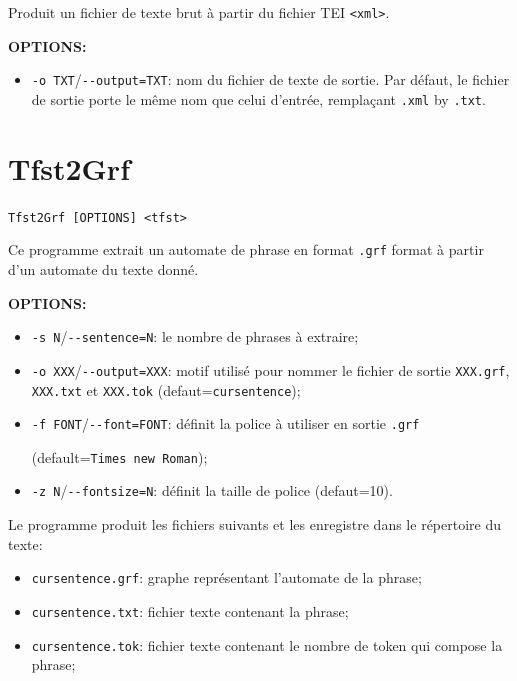 \bigskip
\noindent Produit un fichier de texte brut à partir du fichier TEI \verb+<xml>+.

\bigskip
\noindent \textbf{OPTIONS:}
\begin{itemize}
  \item \verb+-o TXT+/\verb+--output=TXT+: nom du fichier de texte de sortie.
  	  Par défaut, le fichier de sortie porte le même nom que celui d'entrée, 
  	  remplaçant \verb+.xml+ by \verb+.txt+.
\end{itemize}







\section{Tfst2Grf}
\verb+Tfst2Grf [OPTIONS] <tfst>+

\bigskip
\noindent Ce programme extrait un automate de phrase en format \verb+.grf+ format à partir d'un automate du texte donné.

\bigskip
\noindent \textbf{OPTIONS:}
\begin{itemize}
\item \verb+-s N+/\verb+--sentence=N+: le nombre de phrases à extraire;
  
\item \verb+-o XXX+/\verb+--output=XXX+: motif utilisé pour nommer le fichier de sortie
	\verb+XXX.grf+, \verb+XXX.txt+ et \verb+XXX.tok+ (defaut=\verb+cursentence+);
 
\item \verb+-f FONT+/\verb+--font=FONT+: définit la police à utiliser en sortie \verb+.grf+
   
  (default=\verb+Times new Roman+);
\item \verb+-z N+/\verb+--fontsize=N+: définit la taille de police (defaut=10).
\end{itemize}

\bigskip
\noindent Le programme produit les fichiers suivants et les enregistre dans le
répertoire du texte:

\begin{itemize}
\item \verb+cursentence.grf+: graphe représentant l'automate de la phrase; 

\item \verb+cursentence.txt+: fichier texte contenant la phrase;

\item \verb+cursentence.tok+: fichier texte contenant le nombre de token qui compose la phrase;
\end{itemize}







